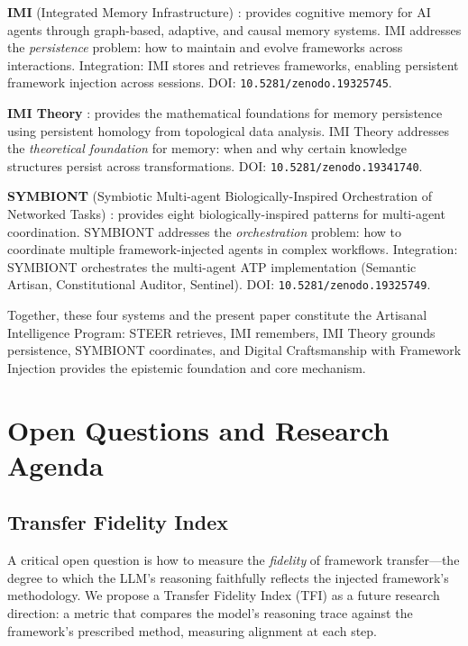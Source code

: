 \documentclass[12pt,a4paper]{article}
\begin{document}
\textbf{IMI} (Integrated Memory Infrastructure) \cite{gomes2026imi}: provides cognitive memory for AI agents through graph-based, adaptive, and causal memory systems. IMI addresses the \emph{persistence} problem: how to maintain and evolve frameworks across interactions. Integration: IMI stores and retrieves frameworks, enabling persistent framework injection across sessions. DOI: \texttt{10.5281/zenodo.19325745}.

\textbf{IMI Theory} \cite{gomes2026imi_theory}: provides the mathematical foundations for memory persistence using persistent homology from topological data analysis. IMI Theory addresses the \emph{theoretical foundation} for memory: when and why certain knowledge structures persist across transformations. DOI: \texttt{10.5281/zenodo.19341740}.

\textbf{SYMBIONT} (Symbiotic Multi-agent Biologically-Inspired Orchestration of Networked Tasks) \cite{gomes2026symbiont}: provides eight biologically-inspired patterns for multi-agent coordination. SYMBIONT addresses the \emph{orchestration} problem: how to coordinate multiple framework-injected agents in complex workflows. Integration: SYMBIONT orchestrates the multi-agent ATP implementation (Semantic Artisan, Constitutional Auditor, Sentinel). DOI: \texttt{10.5281/zenodo.19325749}.

Together, these four systems and the present paper constitute the Artisanal Intelligence Program: STEER retrieves, IMI remembers, IMI Theory grounds persistence, SYMBIONT coordinates, and Digital Craftsmanship with Framework Injection provides the epistemic foundation and core mechanism.


\section{Open Questions and Research Agenda}
\label{sec:agenda}

\subsection{Transfer Fidelity Index}

A critical open question is how to measure the \emph{fidelity} of framework transfer---the degree to which the LLM's reasoning faithfully reflects the injected framework's methodology. We propose a Transfer Fidelity Index (TFI) as a future research direction: a metric that compares the model's reasoning trace against the framework's prescribed method, measuring alignment at each step.
\end{document}
